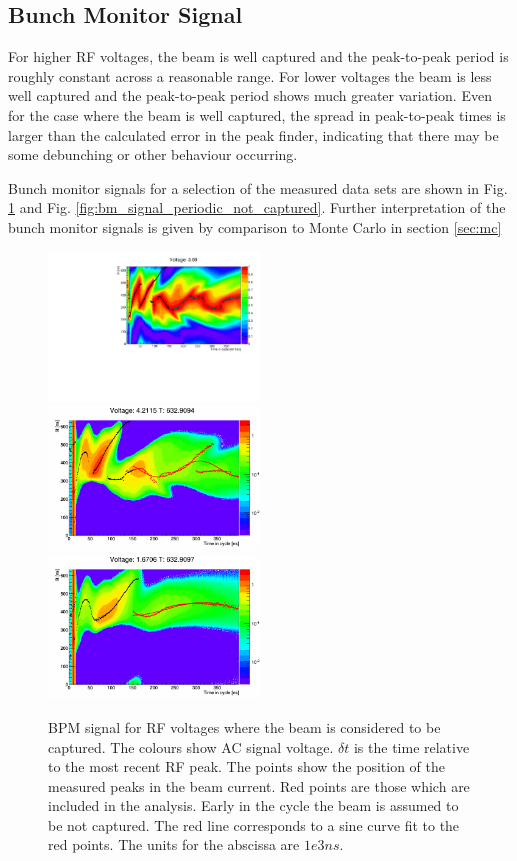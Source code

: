 \documentclass{paper}
\begin{document}
\subsection{Bunch Monitor Signal}
For higher RF voltages, the beam is well captured and the peak-to-peak period is
roughly constant across a reasonable range. For lower voltages the beam is less 
well captured and the peak-to-peak period shows much greater variation. Even for 
the case where the beam is well captured, the spread in peak-to-peak times is 
larger than the calculated error in the peak finder, indicating that there may 
be some debunching or other behaviour occurring.

Bunch monitor signals for a selection of the measured data sets are shown in 
Fig. \ref{fig:bm_signal_periodic_captured} and Fig. 
\ref{fig:bm_signal_periodic_not_captured}. Further interpretation of the
bunch monitor signals is given by comparison to Monte Carlo in section 
\ref{sec:mc}

\begin{figure}
		\includegraphics[width=0.5\textwidth]{images/V=7_18_fitted_bpm_to_rf_deltas}
		\includegraphics[width=0.5\textwidth]{images/V=4_21_fitted_bpm_to_rf_deltas}
		\includegraphics[width=0.5\textwidth]{images/V=1_67_fitted_bpm_to_rf_deltas}
	\caption{BPM signal for RF voltages where the beam is considered to be
           captured. The colours show AC signal voltage. $\delta t$ is the time
           relative to the most recent RF peak. The points show the position of
           the measured peaks in the beam current. Red points are those which
           are included in the analysis. Early in the cycle the beam is assumed
           to be not captured. The red line corresponds to a sine curve fit to
           the red points. The units for the abscissa are $1e3 ns$.}
	\label{fig:bm_signal_periodic_captured}
\end{figure}
\end{document}
